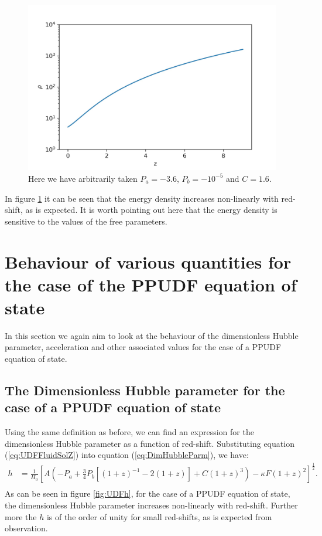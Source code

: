 \documentclass[a4paper, 11pt]{FSKH_623_Report}
\numberwithin{equation}{section}
\newcommand{\brac}[1]{\left(#1\right)}
\newcommand{\bracc}[1]{\left[#1\right]}
\begin{document}
\begin{figure}[H]
\centering
\includegraphics[scale=1]{Figures/UDF_rho.jpg}
\caption{Here we have arbitrarily taken $P_{a}=-3.6$, $P_{b}=-10^{-5}$ and $C=1.6$.}
\label{fig:UDFRho}
\end{figure}
In figure \ref{fig:UDFRho} it can be seen that the energy density increases non-linearly with red-shift, as is expected. It is worth pointing out here that the energy density is sensitive to the values of the free parameters.

\section{Behaviour of various quantities for the case of the PPUDF equation of state}
In this section we again aim to look at the behaviour of the dimensionless Hubble parameter, acceleration and other associated values for the case of a PPUDF equation of state.
\subsection{The Dimensionless Hubble parameter for the case of a PPUDF equation of state}
Using the same definition as before, we can find an expression for the dimensionless Hubble parameter as a function of red-shift. Substituting equation (\ref{eq:UDFFluidSolZ}) into equation (\ref{eq:DimHubbleParm}), we have:
\begin{equation}\label{eq:UDFDimh}
\begin{split}
h &= \frac{1}{H_{0}}\bracc{A\brac{-P_{a}+\frac{3}{4}P_{b}\bracc{\brac{1+z}^{-1}-2\brac{1+z}}+C\brac{1+z}^{3}} -\kappa F \brac{1+z}^{2}}^{\frac{1}{2}}.\\
\end{split}
\end{equation}
As can be seen in figure \ref{fig:UDFh}, for the case of a PPUDF equation of state, the dimensionless Hubble parameter increases non-linearly with red-shift. Further more the $h$ is of the order of unity for small red-shifts, as is expected from observation. 
\end{document}
